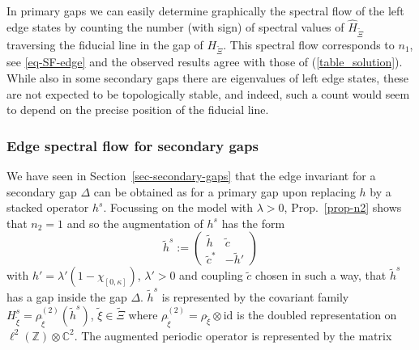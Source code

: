 \documentclass[11pt]{amsart}
\newcommand{\Z}{\mathbb{Z}}
\newcommand{\C}{\mathbb{C}}
\newcommand{\cut}{\kappa}
\newcommand{\che}{\text{ch}^{(e)}}
\begin{document}
In primary gaps we can easily determine  graphically the spectral flow of the left edge states by 
counting the number (with sign) of spectral values of $\hat{H}_{\tilde{\Xi}}$ traversing the fiducial line in the gap of $H_{\tilde{\Xi}}$. This spectral flow corresponds to $n_1$, see \eqref{eq-SF-edge} and the observed results agree with those of (\ref{table_solution}).
While also in some secondary gaps there are eigenvalues of left edge states, these are not expected to be topologically stable, and indeed, such a count would seem to depend on the precise position of the fiducial line.   


\subsubsection{Edge spectral flow for secondary gaps} We have seen in Section~\ref{sec-secondary-gaps} that the edge invariant for a secondary gap $\Delta$ can be obtained as for a primary gap upon replacing $h$ by a stacked operator $h^s$. Focussing on the model with $\lambda>0$, Prop.~\ref{prop-n2} shows that $n_2=1$ and so the augmentation of $h^s$ has the form 
$$\tilde h^s:=\begin{pmatrix}
	\tilde h & \tilde c \\ \tilde c^* & -\tilde h' %
\end{pmatrix}$$
with $h'=\lambda'(1-\chi_{[0,\cut]})$, $\lambda'>0$ and coupling $\tilde c$ chosen in such a way, that $\tilde h^s$ has a gap inside the gap $\Delta$. 
$\tilde h^s$ is represented by the covariant family $H^s_{\tilde\xi}=\rho^{(2)}_{\tilde\xi}(\tilde h^s)$, $\tilde \xi\in\tilde\Xi$ where  $\rho^{(2)}_{\tilde\xi} = \rho_{\tilde\xi}\otimes\mathrm{id}$ is the doubled representation on $\ell^2(\Z)\otimes\C^2$. The augmented periodic operator is represented by the matrix   
\end{document}
